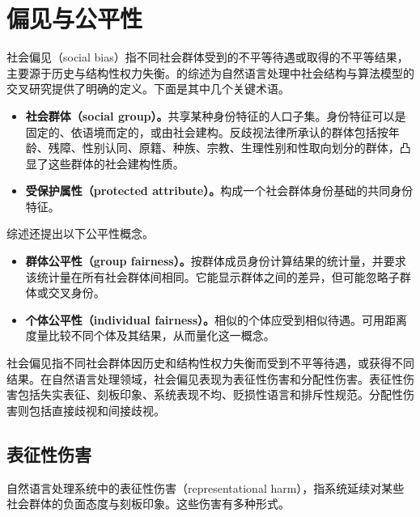 \section{偏见与公平性}
\label{sec:ch06-bias}

\begin{keypoint}
社会偏见（social bias）指不同社会群体受到的不平等待遇或取得的不平等结果，主要源于历史与结构性权力失衡。的综述为自然语言处理中社会结构与算法模型的交叉研究提供了明确的定义。下面是其中几个关键术语。
\begin{itemize}
\item \textbf{社会群体（social group）。}共享某种身份特征的人口子集。身份特征可以是固定的、依语境而定的，或由社会建构。反歧视法律所承认的群体包括按年龄、残障、性别认同、原籍、种族、宗教、生理性别和性取向划分的群体，凸显了这些群体的社会建构性质。
\item \textbf{受保护属性（protected attribute）。}构成一个社会群体身份基础的共同身份特征。
\end{itemize}
综述还提出以下公平性概念。
\begin{itemize}
\item \textbf{群体公平性（group fairness）。}按群体成员身份计算结果的统计量，并要求该统计量在所有社会群体间相同。它能显示群体之间的差异，但可能忽略子群体或交叉身份。
\item \textbf{个体公平性（individual fairness）。}相似的个体应受到相似待遇。可用距离度量比较不同个体及其结果，从而量化这一概念。
\end{itemize}
\end{keypoint}

社会偏见指不同社会群体因历史和结构性权力失衡而受到不平等待遇，或获得不同结果。在自然语言处理领域，社会偏见表现为表征性伤害和分配性伤害。表征性伤害包括失实表征、刻板印象、系统表现不均、贬损性语言和排斥性规范。分配性伤害则包括直接歧视和间接歧视。

\subsection{表征性伤害}
自然语言处理系统中的表征性伤害（representational harm），指系统延续对某些社会群体的负面态度与刻板印象。这些伤害有多种形式。

